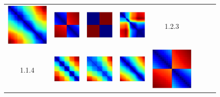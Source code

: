 \documentclass[bachelor, nocolorlinks, printoneside]{seuthesis} %
\begin{document}
\begin{Main}
\begin{figure}[ht!]
\begin{centering}
\begin{tabular}{cccc|cccc}
        \includegraphics[width=0.12\columnwidth,keepaspectratio]{figs/toyset_matrices/cluster_5by20_3_3.png} &  
        \includegraphics[width=0.12\columnwidth,keepaspectratio]{figs/toyset_matrices/cluster_2by10_3_1.png} &
        \includegraphics[width=0.12\columnwidth,keepaspectratio]{figs/toyset_matrices/cluster_2by10_3_2.png} &
        \includegraphics[width=0.12\columnwidth,keepaspectratio]{figs/toyset_matrices/cluster_2by10_3_3.png} & 1.2.3\\
        1.1.4 &\includegraphics[width=0.12\columnwidth,keepaspectratio]{figs/toyset_matrices/cluster_5by20_4_1.png} &
        \includegraphics[width=0.12\columnwidth,keepaspectratio]{figs/toyset_matrices/cluster_5by20_4_2.png} &
        \includegraphics[width=0.12\columnwidth,keepaspectratio]{figs/toyset_matrices/cluster_5by20_4_3.png} &  
        \includegraphics[width=0.12\columnwidth,keepaspectratio]{figs/toyset_matrices/cluster_2by10_4_1.png} &

\end{tabular}
\end{centering}
\end{figure}
\end{Main}
\end{document}
